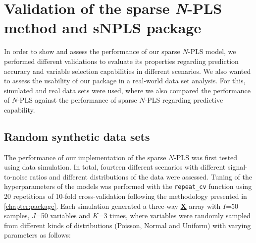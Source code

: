 
\chapter[Validation of the sparse \textit{N}-PLS method and sNPLS package]{Validation of the sparse \textit{N}-PLS method and sNPLS package}
\label{chapter:validation}
In order to show and assess the performance of our sparse $N$-PLS model, we performed different validations to evaluate its properties regarding prediction accuracy and variable selection capabilities in different scenarios. We also wanted to assess the usability of our package in a real-world data set analysis. For this, simulated and real data sets were used, where we also compared the performance of $N$-PLS against the performance of sparse $N$-PLS regarding predictive capability.


\section{Random synthetic data sets}
The performance of our implementation of the sparse $N$-PLS was first tested using data simulation. In total, fourteen different scenarios with different signal-to-noise ratios and different distributions of the data were assessed. Tuning of the hyperparameters of the models was performed with the \texttt{repeat\_cv} function using 20 repetitions of 10-fold cross-validation following the methodology presented in \autoref{chapter:package}. Each simulation generated a three-way \textbf{\underline{X}} array with $I$=50 samples, $J$=50 variables and $K$=3 times, where variables were randomly sampled from different kinds of distributions (Poisson, Normal and Uniform) with varying parameters as follows:


